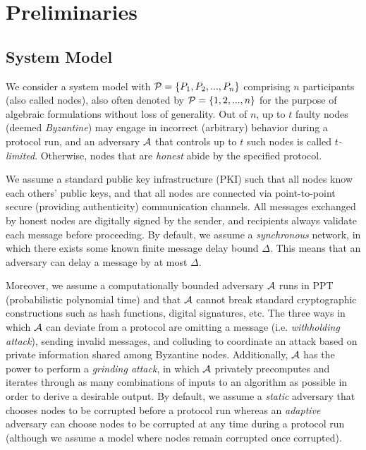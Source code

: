 \section{Preliminaries}
\label{section:preliminaries}
\subsection{System Model}
We consider a system model with $\mathcal{P} = \{P_1, P_2, ..., P_n\}$ comprising $n$ participants (also called nodes), also often denoted by $\mathcal{P} = \{1, 2, ..., n\}$ for the purpose of algebraic formulations without loss of generality. Out of $n$, up to $t$ faulty nodes (deemed \textit{Byzantine}) may engage in incorrect (arbitrary) behavior during a protocol run, and an adversary $\mathcal{A}$ that controls up to $t$ such nodes is called \textit{$t$-limited}. Otherwise, nodes that are \textit{honest} abide by the specified protocol.

We assume a standard public key infrastructure (PKI) such that all nodes know each others' public keys, and that all nodes are connected via point-to-point secure (providing authenticity) communication channels. All messages exchanged by honest nodes are digitally signed by the sender, and recipients always validate each message before proceeding. By default, we assume a \textit{synchronous} network, in which there exists some known finite message delay bound $\Delta$. This means that an adversary can delay a message by at most $\Delta$.

Moreover, we assume a computationally bounded adversary $\mathcal{A}$ runs in PPT (probabilistic polynomial time) and that $\mathcal{A}$ cannot break standard cryptographic constructions such as hash functions, digital signatures, etc. The three ways in which $\mathcal{A}$ can deviate from a protocol are omitting a message (i.e. \textit{withholding attack}), sending invalid messages, and colluding to coordinate an attack based on private information shared among Byzantine nodes. Additionally, $\mathcal{A}$ has the power to perform a \textit{grinding attack}, in which $\mathcal{A}$ privately precomputes and iterates through as many combinations of inputs to an algorithm as possible in order to derive a desirable output. By default, we assume a \textit{static} adversary that chooses nodes to be corrupted before a protocol run whereas an \textit{adaptive} adversary can choose nodes to be corrupted at any time during a protocol run (although we assume a model where nodes remain corrupted once corrupted).

